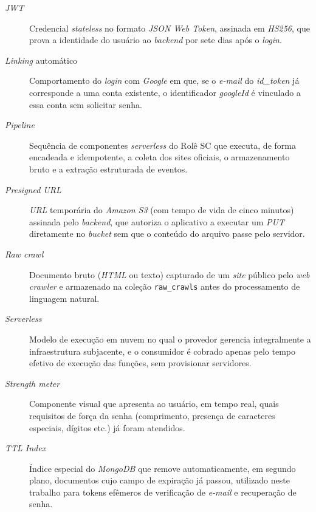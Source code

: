 \begin{description}
\item[\textit{JWT}] Credencial \textit{stateless} no formato \textit{JSON Web Token}, assinada em \textit{HS256}, que prova a identidade do usuário ao \textit{backend} por sete dias após o \textit{login}.

\item[\textit{Linking} automático] Comportamento do \textit{login} com \textit{Google} em que, se o \textit{e-mail} do \textit{id\_token} já corresponde a uma conta existente, o identificador \textit{googleId} é vinculado a essa conta sem solicitar senha.

\item[\textit{Pipeline}] Sequência de componentes \textit{serverless} do Rolê SC que executa, de forma encadeada e idempotente, a coleta dos sites oficiais, o armazenamento bruto e a extração estruturada de eventos.

\item[\textit{Presigned URL}] \textit{URL} temporária do \textit{Amazon S3} (com tempo de vida de cinco minutos) assinada pelo \textit{backend}, que autoriza o aplicativo a executar um \textit{PUT} diretamente no \textit{bucket} sem que o conteúdo do arquivo passe pelo servidor.

\item[\textit{Raw crawl}] Documento bruto (\textit{HTML} ou texto) capturado de um \textit{site} público pelo \textit{web crawler} e armazenado na coleção \texttt{raw\_crawls} antes do processamento de linguagem natural.

\item[\textit{Serverless}] Modelo de execução em nuvem no qual o provedor gerencia integralmente a infraestrutura subjacente, e o consumidor é cobrado apenas pelo tempo efetivo de execução das funções, sem provisionar servidores.

\item[\textit{Strength meter}] Componente visual que apresenta ao usuário, em tempo real, quais requisitos de força da senha (comprimento, presença de caracteres especiais, dígitos etc.) já foram atendidos.

\item[\textit{TTL Index}] Índice especial do \textit{MongoDB} que remove automaticamente, em segundo plano, documentos cujo campo de expiração já passou, utilizado neste trabalho para tokens efêmeros de verificação de \textit{e-mail} e recuperação de senha.

\end{description}

